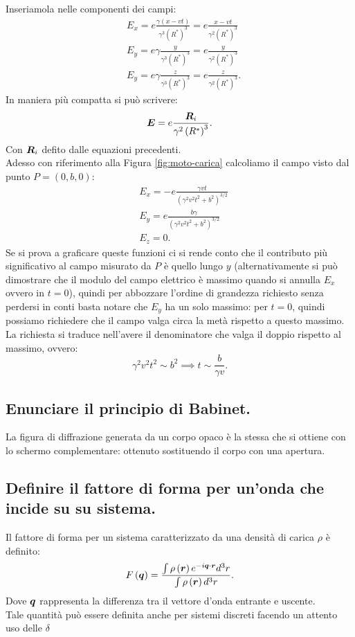 Inseriamola nelle componenti dei campi: 
\begin{align*}
	&E_x = e \frac{\gamma\left( x-vt \right) }{\gamma^3\left(R^{*}\right)^3} = e \frac{x-vt}{\gamma^2 \left(R^*\right)^3}\\
	&E_y = e \gamma \frac{y}{\gamma^3\left(R^*\right)^3} = e \frac{y}{\gamma^2\left(R^*\right)^3} \\ 
	&E_y = e \gamma \frac{z}{\gamma^3\left(R^*\right)^3} = e \frac{z}{\gamma^2 \left(R^*\right)^3} 
.\end{align*}
In maniera più compatta si può scrivere:
\[
	\boldsymbol{E}=e \frac{\boldsymbol{R}_i}{\gamma^2 \left( R^* \right)^3}
.\] 
Con $\boldsymbol{R}_i$ defito dalle equazioni precedenti.\\
Adesso con riferimento alla Figura \ref{fig:moto-carica} calcoliamo il campo visto dal punto $P=\left( 0,b,0 \right) $:
\begin{align*}
	&E_x = -e \frac{\gamma vt}{\left( \gamma^2v^2t^2 + b^2 \right)^{3 /2} }\\
	&E_y = e \frac{b\gamma }{\left( \gamma^2v^2t^2 + b^2 \right)^{3 /2}}\\
	&E_z = 0
.\end{align*}
Se si prova a graficare queste funzioni ci si rende conto che il contributo più significativo al campo misurato da $P$ è quello lungo $y$ (alternativamente si può dimostrare che il modulo del campo elettrico è massimo quando si annulla $E_x$ ovvero in  $t=0$), quindi per abbozzare l'ordine di grandezza richiesto senza perdersi in conti basta notare che $E_y$ ha un solo massimo: per $t=0$, quindi possiamo richiedere che il campo valga circa la metà rispetto a questo massimo. La richiesta si traduce nell'avere il denominatore che valga il doppio rispetto al massimo, ovvero:
\[
	\gamma^2v^2t^2 \sim b^2 \implies t \sim \frac{b}{\gamma v}
.\] 
\subsection[]{Enunciare il principio di Babinet.}
\label{sec:3.a.16}
La figura di diffrazione generata da un corpo opaco è la stessa che si ottiene con lo schermo complementare: ottenuto sostituendo il corpo con una apertura.

\subsection[]{Definire il fattore di forma per un'onda che incide su su sistema.}
\label{sec:3.a.17}
Il fattore di forma per un sistema caratterizzato da una densità di carica $\rho$ è definito:
\[
	F\left(\boldsymbol{q} \right) = \frac{\int\rho\left( \boldsymbol{r} \right) e^{-i \boldsymbol{q}\cdot \boldsymbol{r}} d^3r}{\int\rho\left( \boldsymbol{r} \right) d^3r}
.\] 
Dove $\boldsymbol{q}$ rappresenta la differenza tra il vettore d'onda entrante e uscente.\\
Tale quantità può essere definita anche per sistemi discreti facendo un attento uso delle $\delta$
